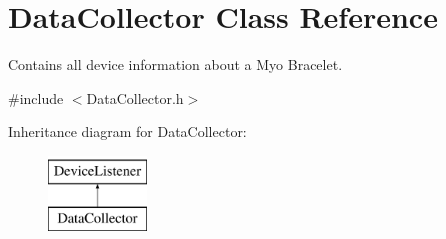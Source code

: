 \hypertarget{class_data_collector}{}\section{Data\+Collector Class Reference}
\label{class_data_collector}


Contains all device information about a Myo Bracelet.  




{\ttfamily \#include $<$Data\+Collector.\+h$>$}

Inheritance diagram for Data\+Collector\+:\begin{figure}[H]
\begin{center}
\leavevmode
\includegraphics[height=2.000000cm]{class_data_collector}
\end{center}
\end{figure}
